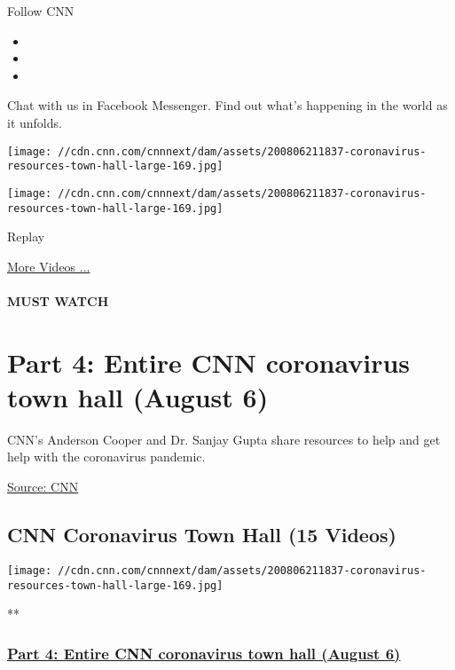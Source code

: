 Follow CNN

\begin{itemize}
\item
\item
\item
\end{itemize}

Chat with us in Facebook Messenger. Find out what's happening in the
world as it unfolds.

\texttt{[image: //cdn.cnn.com/cnnnext/dam/assets/200806211837-coronavirus-resources-town-hall-large-169.jpg]}

\texttt{[image: //cdn.cnn.com/cnnnext/dam/assets/200806211837-coronavirus-resources-town-hall-large-169.jpg]}\href{javascript:void(0);}{}

Replay

\href{/videos}{More Videos ...}

\hypertarget{must-watch}{%
\paragraph{MUST WATCH}\label{must-watch}}

\hypertarget{part-4-entire-cnn-coronavirus-town-hall-august-6}{%
\section{Part 4: Entire CNN coronavirus town hall (August
6)}\label{part-4-entire-cnn-coronavirus-town-hall-august-6}}

CNN's Anderson Cooper and Dr. Sanjay Gupta share resources to help and
get help with the coronavirus pandemic.

\href{https://www.cnn.com/}{Source: CNN}

\hypertarget{cnn-coronavirus-town-hall-15-videos}{%
\subsection{CNN Coronavirus Town Hall (15
Videos)}\label{cnn-coronavirus-town-hall-15-videos}}

\href{/videos/health/2020/08/06/entire-august-6-coronavirus-town-hall-part-4-sot-vpx.cnn}{}

\texttt{[image: //cdn.cnn.com/cnnnext/dam/assets/200806211837-coronavirus-resources-town-hall-large-169.jpg]}

**

\hypertarget{part-4-entire-cnn-coronavirus-town-hall-august-6-1}{%
\subsubsection{\texorpdfstring{\href{/videos/health/2020/08/06/entire-august-6-coronavirus-town-hall-part-4-sot-vpx.cnn}{Part
4: Entire CNN coronavirus town hall (August
6)}}{Part 4: Entire CNN coronavirus town hall (August 6)}}\label{part-4-entire-cnn-coronavirus-town-hall-august-6-1}}

